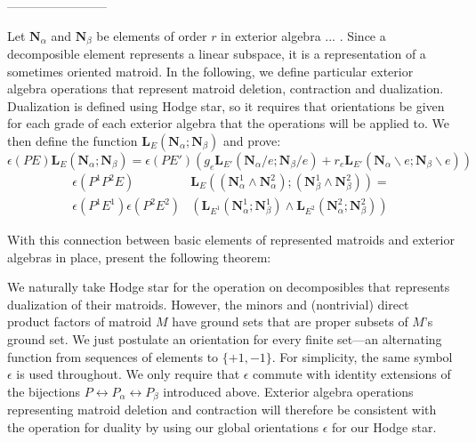 \documentclass[Unicode]{cedram-alco}
\newcommand{\ext}[1]{\ensuremath{\mathbf{#1}}}
\newcommand{\eNal}{\ensuremath{\ext{N}_{\alpha}}}
\newcommand{\eNbe}{\ensuremath{\ext{N}_\beta}}
\newcommand{\extLHorSub}[3]{\ext{L}_{#1}\left(  {#2}; {#3}  \right)}
\newcommand{\LHorSub}[3]{\ext{L}_{#1}\left(  {#2}; {#3}  \right)}
\begin{document}
------------------------


Let $\ext{N}_\alpha$ and $\ext{N}_\beta$ be elements of order
$r$ in exterior algebra ... .  Since a decomposible element
represents a linear subspace, it is a representation of a
sometimes oriented matroid.  In the following, we define
particular exterior algebra operations that represent
matroid deletion, contraction and dualization.  Dualization is
defined using Hodge star, so it requires that orientations
be given for each grade of each exterior algebra that the
operations will be applied to.  We then define
the function $\ext{L}_E(\ext{N}_\alpha;\ext{N}_\beta)$ and prove:
  \begin{equation}\label{delecontrequationintro}
     \epsilon(PE)\extLHorSub{E}{\eNal}{\eNbe}=
      \epsilon(PE')
      \left(
      g_e\extLHorSub{E'}{\eNal/e}{\eNbe/e} +
      r_e\extLHorSub{E'}{\eNal\backslash e}{\eNbe\backslash e}\right)
  \end{equation}
  \begin{equation}\label{productequationintro}
    \begin{split}
    \epsilon(P^1P^2E)
    &\LHorSub{E}
            {(\ext{N}_\alpha^{1}\wedge\ext{N}_\alpha^{2})}
            {(\ext{N}_\beta^{1}\wedge\ext{N}_\beta^{2})}
    = \\
    \epsilon(P^{1}E^{1})
    \epsilon(P^{2}E^{2}) 
        &\left(\LHorSub{E^{1}}{\ext{N}_\alpha^{1}}{\ext{N}_\beta^{1}}
        \wedge
        \LHorSub{E^{2}}{\ext{N}_\alpha^{2}}{\ext{N}_\beta^{2}}
          \right)
    \end{split}
  \end{equation}

  
With this connection between basic elements of represented matroids
and exterior algebras in place, present the following theorem:


We naturally take Hodge star for the operation on
decomposibles that represents dualization of their
matroids.
However, the minors and
(nontrivial) direct product factors of matroid $M$
have ground sets that are proper subsets of $M$'s ground set.
We just postulate an orientation for every finite set---an alternating
function
from sequences of elements to $\{+1,-1\}$.
For simplicity, the same symbol $\epsilon$ is used throughout.
We only require that $\epsilon$ commute with identity
extensions of the bijections 
$P \leftrightarrow P_{\alpha}\leftrightarrow P_{\beta}$
introduced above.
Exterior algebra operations
representing matroid deletion and contraction will therefore
be consistent with the operation for duality by using our
global orientations $\epsilon$ for our Hodge star.
\end{document}
